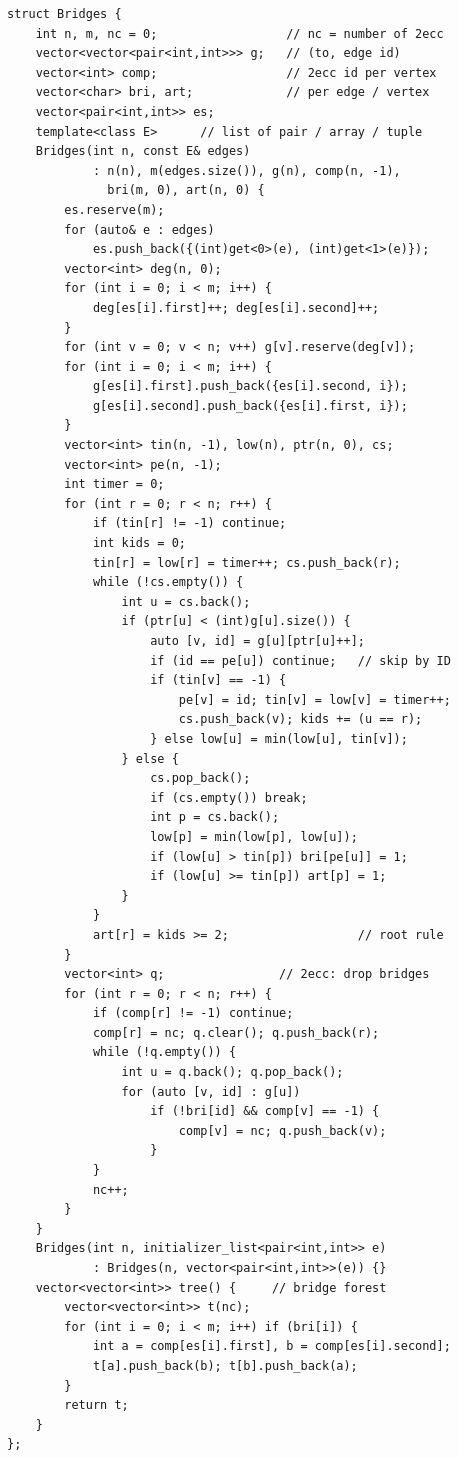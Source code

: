 \documentclass[9pt,a4paper]{extarticle}
\begin{document}
\begin{multicols*}{3}
\begin{lstlisting}
struct Bridges {
    int n, m, nc = 0;                  // nc = number of 2ecc
    vector<vector<pair<int,int>>> g;   // (to, edge id)
    vector<int> comp;                  // 2ecc id per vertex
    vector<char> bri, art;             // per edge / vertex
    vector<pair<int,int>> es;
    template<class E>      // list of pair / array / tuple
    Bridges(int n, const E& edges)
            : n(n), m(edges.size()), g(n), comp(n, -1),
              bri(m, 0), art(n, 0) {
        es.reserve(m);
        for (auto& e : edges)
            es.push_back({(int)get<0>(e), (int)get<1>(e)});
        vector<int> deg(n, 0);
        for (int i = 0; i < m; i++) {
            deg[es[i].first]++; deg[es[i].second]++;
        }
        for (int v = 0; v < n; v++) g[v].reserve(deg[v]);
        for (int i = 0; i < m; i++) {
            g[es[i].first].push_back({es[i].second, i});
            g[es[i].second].push_back({es[i].first, i});
        }
        vector<int> tin(n, -1), low(n), ptr(n, 0), cs;
        vector<int> pe(n, -1);
        int timer = 0;
        for (int r = 0; r < n; r++) {
            if (tin[r] != -1) continue;
            int kids = 0;
            tin[r] = low[r] = timer++; cs.push_back(r);
            while (!cs.empty()) {
                int u = cs.back();
                if (ptr[u] < (int)g[u].size()) {
                    auto [v, id] = g[u][ptr[u]++];
                    if (id == pe[u]) continue;   // skip by ID
                    if (tin[v] == -1) {
                        pe[v] = id; tin[v] = low[v] = timer++;
                        cs.push_back(v); kids += (u == r);
                    } else low[u] = min(low[u], tin[v]);
                } else {
                    cs.pop_back();
                    if (cs.empty()) break;
                    int p = cs.back();
                    low[p] = min(low[p], low[u]);
                    if (low[u] > tin[p]) bri[pe[u]] = 1;
                    if (low[u] >= tin[p]) art[p] = 1;
                }
            }
            art[r] = kids >= 2;                  // root rule
        }
        vector<int> q;                // 2ecc: drop bridges
        for (int r = 0; r < n; r++) {
            if (comp[r] != -1) continue;
            comp[r] = nc; q.clear(); q.push_back(r);
            while (!q.empty()) {
                int u = q.back(); q.pop_back();
                for (auto [v, id] : g[u])
                    if (!bri[id] && comp[v] == -1) {
                        comp[v] = nc; q.push_back(v);
                    }
            }
            nc++;
        }
    }
    Bridges(int n, initializer_list<pair<int,int>> e)
            : Bridges(n, vector<pair<int,int>>(e)) {}
    vector<vector<int>> tree() {     // bridge forest
        vector<vector<int>> t(nc);
        for (int i = 0; i < m; i++) if (bri[i]) {
            int a = comp[es[i].first], b = comp[es[i].second];
            t[a].push_back(b); t[b].push_back(a);
        }
        return t;
    }
};
\end{lstlisting}


\end{multicols*}
\end{document}
